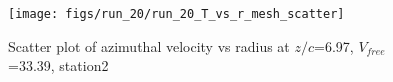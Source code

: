 \begin{figure}[H]
\centering
\texttt{[image: figs/run\_20/run\_20\_T\_vs\_r\_mesh\_scatter]}
\caption{Scatter plot of azimuthal velocity vs radius at $z/c$=6.97, $V_{free}$=33.39, station2}
\label{fig:run_20_T_vs_r_mesh_scatter}
\end{figure}


